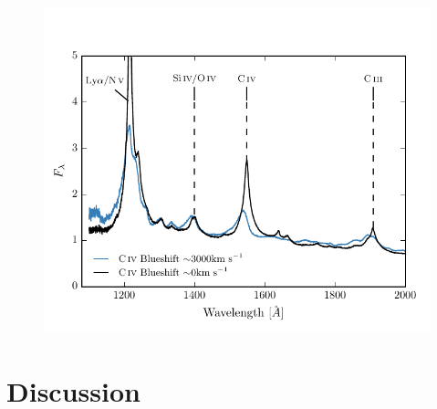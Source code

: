 \begin{figure}
\centering
  \includegraphics[width=\columnwidth]{figures/chapter05/blueshift_composite.pdf}
\caption{}
  \label{fig:blueshift_composite}
\end{figure}




\section{Discussion}

